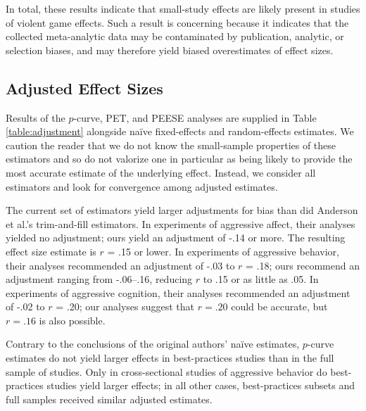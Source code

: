 \documentclass[man, mask]{apa6}
\begin{document}
In total, these results indicate that small-study effects are likely present in studies of violent game effects. Such a result is concerning because it indicates that the collected meta-analytic data may be contaminated by publication, analytic, or selection biases, and may therefore yield biased overestimates of effect sizes.

\subsection{Adjusted Effect Sizes}
Results of the $p$-curve, PET, and PEESE analyses are supplied in Table \ref{table:adjustment} alongside na{\"i}ve fixed-effects and random-effects estimates. We caution the reader that we do not know the small-sample properties of these estimators and so do not valorize one in particular as being likely to provide the most accurate estimate of the underlying effect. Instead, we consider all estimators and look for convergence among adjusted estimates.

The current set of estimators yield larger adjustments for bias than did Anderson et al.'s trim-and-fill estimators.  In experiments of aggressive affect, their analyses yielded no adjustment; ours yield an adjustment of -.14 or more.  The resulting effect size estimate is $r$ = .15 or lower. In experiments of aggressive behavior, their analyses recommended an adjustment of -.03 to $r$ = .18; ours recommend an adjustment ranging from -.06--.16, reducing $r$ to .15 or as little as .05. In experiments of aggressive cognition, their analyses recommended an adjustment of -.02 to $r$ = .20; our analyses suggest that $r = .20$ could be accurate, but $r = .16$ is also possible.   

Contrary to the conclusions of the original authors' na{\"i}ve estimates, $p$-curve estimates do not yield larger effects in best-practices studies than in the full sample of studies. Only in cross-sectional studies of aggressive behavior do best-practices studies yield larger effects; in all other cases, best-practices subsets and full samples received similar adjusted estimates. 
\end{document}
